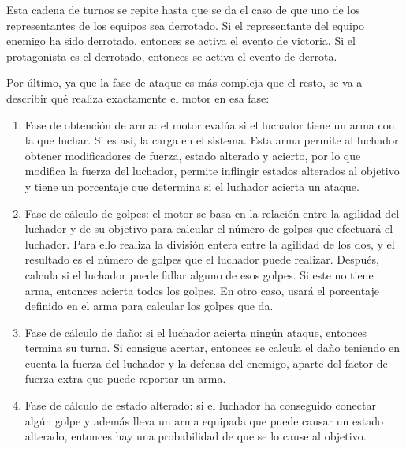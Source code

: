 Esta cadena de turnos se repite hasta que se da el caso de que uno de los representantes de los equipos sea derrotado. Si el representante del equipo enemigo ha sido derrotado, entonces se activa el evento de victoria. Si el protagonista es el derrotado, entonces se activa el evento de derrota.

Por último, ya que la fase de ataque es más compleja que el resto, se va a describir qué realiza exactamente el motor en esa fase:
\begin{enumerate}
	\item Fase de obtención de arma: el motor evalúa si el luchador tiene un arma con la que luchar. Si es así, la carga en el sistema. Esta arma permite al luchador obtener modificadores de fuerza, estado alterado y acierto, por lo que modifica la fuerza del luchador, permite inflingir estados alterados al objetivo y tiene un porcentaje que determina si el luchador acierta un ataque.
	\item Fase de cálculo de golpes: el motor se basa en la relación entre la agilidad del luchador y de su objetivo para calcular el número de golpes que efectuará el luchador. Para ello realiza la división entera entre la agilidad de los dos, y el resultado es el número de golpes que el luchador puede realizar.
	Después, calcula si el luchador puede fallar alguno de esos golpes. Si este no tiene arma, entonces acierta todos los golpes. En otro caso, usará el porcentaje definido en el arma para calcular los golpes que da.
	\item Fase de cálculo de daño: si el luchador acierta ningún ataque, entonces termina su turno. Si consigue acertar, entonces se calcula el daño teniendo en cuenta la fuerza del luchador y la defensa del enemigo, aparte del factor de fuerza extra que puede reportar un arma.
	\item Fase de cálculo de estado alterado: si el luchador ha conseguido conectar algún golpe y además lleva un arma equipada que puede causar un estado alterado, entonces hay una probabilidad de que se lo cause al objetivo.
\end{enumerate}

